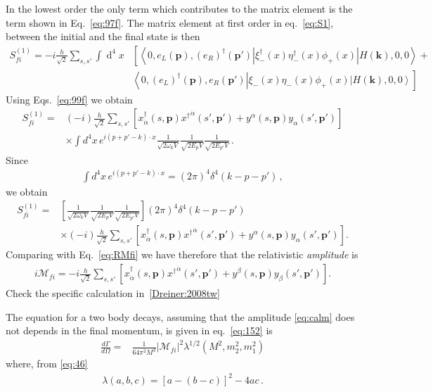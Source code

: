 In the lowest order the only term which contributes to the matrix element is the term shown in Eq.~\eqref{eq:97f}.
The matrix element at first order in eq.~\eqref{eq:S1}, between the initial and the final state is then
\begin{align}
  S_{fi}^{(1)}=-i \frac{h}{\sqrt{2}} \sum_{s,s'} \int \operatorname{d}^4x &\left[ \left\langle 0, e_L(\boldsymbol{p}),\left( e_R \right)^{\dagger}(
\boldsymbol{p}') \left|\xi_-^{\dagger}(x)\eta_-^{\dagger}(x) \phi_{+}(x)  \right|H(\mathbf{k}),0,0 \right\rangle
   \right. +\nonumber\\
&\left.\left\langle 0,\left( e_L \right)^{\dagger}(\boldsymbol{p}), e_R (\boldsymbol{p}') \right|\xi_-(x)\eta_-(x) \phi_{+}(x)  \left|H(\mathbf{k}),0,0 \right\rangle \right] 
\end{align}
Using Eqs.~\eqref{eq:99f}  we obtain
\begin{align}
  S_{fi}^{(1)}=&(-i )\frac{h}{\sqrt{2}}  \sum_{s,s'}\left[ x^{\dagger}_{\dot{\alpha}}(s,\boldsymbol{p}){x^{\dagger}}^{\dot{\alpha}}(s',\boldsymbol{p}')+y^{\alpha}(s,\boldsymbol{p})y_{\alpha}(s',\boldsymbol{p}') \right] \nonumber\\
&\times\int d^4x\,e^{i(p+p'-k)\cdot x}\frac{1}{\sqrt{2\omega_k V}}\frac{1}{\sqrt{2E_p V}}\frac{1}{\sqrt{2E_{p'} V}}\,.
\end{align}
Since
\begin{align}
  \int d^4x\,e^{i(p+p'-k)\cdot x}=(2\pi)^4\delta^4(k-p-p')\,,
\end{align}
we obtain
\begin{align}
  S_{fi}^{(1)}=&\left[\frac{1}{\sqrt{2\omega_k V}}\frac{1}{\sqrt{2E_p V}}\frac{1}{\sqrt{2E_{p'} V}}\right]
(2\pi)^4\delta^4(k-p-p') \nonumber\\
&\times(-i )\frac{h}{\sqrt{2}}\sum_{s,s'}\left[ x^{\dagger}_{\dot{\alpha}}(s,\boldsymbol{p}){x^{\dagger}}^{\dot{\alpha}}(s',\boldsymbol{p}')+y^{\alpha}(s,\boldsymbol{p})y_{\alpha}(s',\boldsymbol{p}') \right].
\end{align}
Comparing with Eq.~\eqref{eq:RMfi} we have therefore that the relativistic \emph{amplitude} is
\begin{align}
\label{eq:calm}
  i\mathcal{M}_{fi}=-i \frac{h}{\sqrt{2}}\sum_{s,s'}\left[ x^{\dagger}_{\dot{\alpha}}(s,\boldsymbol{p}){x^{\dagger}}^{\dot{\alpha}}(s',\boldsymbol{p}')+y^{\beta}(s,\boldsymbol{p})y_{\beta}(s',\boldsymbol{p}') \right].
\end{align}
Check the specific calculation in~\ref{Dreiner:2008tw}

The equation for a two body decays, assuming that the amplitude \eqref{eq:calm} does not depends in the final momentum,  is given in eq.~\eqref{eq:152} is 
\begin{align}
\label{eq:154pdn}
\frac{d\Gamma}{d\Omega}=
&\frac{1}{64 \pi^2M^3}\left|\mathcal{M}_{fi}\right|^2\lambda^{1/2}(M^2,m_2^2,m_1^2)
\end{align}
where, from \eqref{eq:46}
\begin{align}
\label{eq:46n}
  \lambda(a,b,c)=\left[ a-(b-c) \right]^2-4ac\,.
\end{align}


